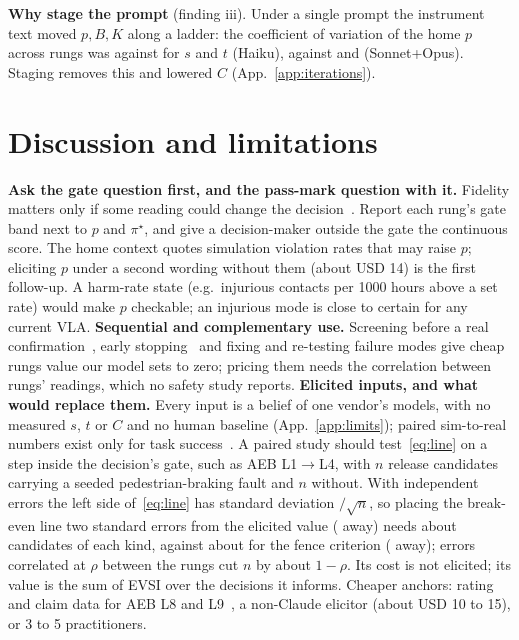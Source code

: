 \documentclass{article}
\newcommand{\pist}{\pi^\star}
\newcommand{\step}[2]{L#1$\to$L#2}
\begin{document}
\textbf{Why stage the prompt} (finding iii). Under a single prompt the instrument text moved $p,B,K$ along a ladder: the coefficient of variation of the home $p$ across rungs was \twDriftCVp{} against \twDriftCVst{} for $s$ and $t$ (Haiku), \twDriftCVpSO{} against \twDriftCVsSO{} and \twDriftCVtSO{} (Sonnet+Opus). Staging removes this and lowered $C$ (App.~\ref{app:iterations}).

\section{Discussion and limitations}
\label{sec:discussion}

\textbf{Ask the gate question first, and the pass-mark question with it.} Fidelity matters only if some reading could change the decision~\citep{howard1966information}. Report each rung's gate band next to $p$ and $\pist$, and give a decision-maker outside the gate the continuous score. The home context quotes simulation violation rates that may raise $p$; eliciting $p$ under a second wording without them (about USD 14) is the first follow-up. A harm-rate state (e.g.\ injurious contacts per 1000 hours above a set rate) would make $p$ checkable; an injurious mode is close to certain for any current VLA.
\textbf{Sequential and complementary use.} Screening before a real confirmation~\citep{sinha2026rethinking,barrett2024benchmarkearly}, early stopping~\citep{snyder2025stopping} and fixing and re-testing failure modes give cheap rungs value our model sets to zero; pricing them needs the correlation between rungs' readings, which no safety study reports.
\textbf{Elicited inputs, and what would replace them.} Every input is a belief of one vendor's models, with no measured $s$, $t$ or $C$ and no human baseline (App.~\ref{app:limits}); paired sim-to-real numbers exist only for task success~\citep{li2024simpler,jain2025polaris,geminirobotics2025veo,majumdar2025predictive}. A paired study should test~\eqref{eq:line} on a step inside the decision's gate, such as AEB \step{1}{4}, with $n$ release candidates carrying a seeded pedestrian-braking fault and $n$ without. With independent errors the left side of~\eqref{eq:line} has standard deviation \twSettleSD$/\sqrt n$, so placing the break-even line two standard errors from the elicited value (\twSettleGap{} away) needs about \twSettleN{} candidates of each kind, against about \twSettleNFence{} for the fence criterion (\twSettleGapJ{} away); errors correlated at $\rho$ between the rungs cut $n$ by about $1-\rho$. Its cost is not elicited; its value is the sum of EVSI over the decisions it informs. Cheaper anchors: rating and claim data for AEB L8 and L9~\citep{iihs2024paeb,cicchino2022pedestrian}, a non-Claude elicitor (about USD 10 to 15), or 3 to 5 practitioners.
\end{document}
